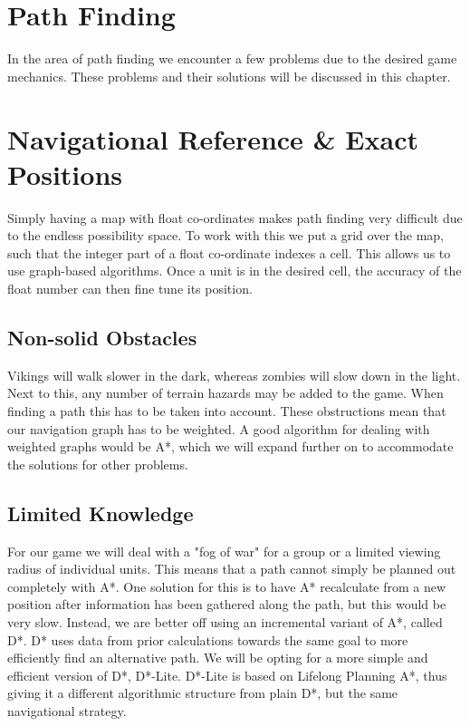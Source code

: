 \section{Path Finding}
In the area of path finding we encounter a few problems due to the desired game mechanics. These problems and their solutions will be discussed in this chapter.

\section{Navigational Reference \& Exact Positions}
Simply having a map with float co-ordinates makes path finding very difficult due to the endless possibility space. To work with this we put a grid over the map, such that the integer part of a float co-ordinate indexes a cell. This allows us to use graph-based algorithms. Once a unit is in the desired cell, the accuracy of the float number can then fine tune its position.

\subsection{Non-solid Obstacles}
Vikings will walk slower in the dark, whereas zombies will slow down in the light. Next to this, any number of terrain hazards may be added to the game. When finding a path this has to be taken into account. These obstructions mean that our navigation graph has to be weighted. A good algorithm for dealing with weighted graphs would be A*, which we will expand further on to accommodate the solutions for other problems.

\subsection{Limited Knowledge}
For our game we will deal with a "fog of war" for a group or a limited viewing radius of individual units. This means that a path cannot simply be planned out completely with A*. One solution for this is to have A* recalculate from a new position after information has been gathered along the path, but this would be very slow. Instead, we are better off using an incremental variant of A*, called D*. D* uses data from prior calculations towards the same goal to more efficiently find an alternative path. We will be opting for a more simple and efficient version of D*, D*-Lite. D*-Lite is based on Lifelong Planning A*, thus giving it a different algorithmic structure from plain D*, but the same navigational strategy. 

